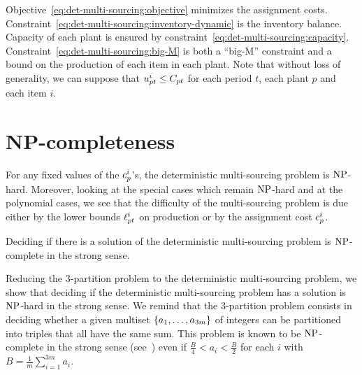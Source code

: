 Objective~\eqref{eq:det-multi-sourcing:objective} minimizes the assignment costs.
Constraint~\eqref{eq:det-multi-sourcing:inventory-dynamic} is the inventory balance.
Capacity of each plant is ensured by constraint~\eqref{eq:det-multi-sourcing:capacity}.
Constraint~\eqref{eq:det-multi-sourcing:big-M} is both a ``big-M'' constraint and a bound on the production of each item in each plant.
Note that without loss of generality, we can suppose that $u_{pt}^i \le C_{pt}$ for each period $t$, each plant $p$ and each item $i$.


\section{NP-completeness}
\label{sec:multi-sourcing:deterministic:NP-completeness}


For any fixed values of the $c_p^i$'s, the deterministic multi-sourcing problem is $\operatorname{NP}$-hard.
Moreover, looking at the special cases which remain $\operatorname{NP}$-hard and at the polynomial cases, we see that the difficulty of the multi-sourcing problem is due either by the lower bounds $\ell_{pt}^i$ on production or by the assignment cost $c_p^i$.


\begin{thm}\label{thm:deterministic-multi-sourcing:strong-NP-hard}
  Deciding if there is a solution of the deterministic multi-sourcing problem is $\operatorname{NP}$-complete in the strong sense.
\end{thm}


Reducing the 3-partition problem to the deterministic multi-sourcing problem, we show that deciding if the deterministic multi-sourcing problem has a solution is $\operatorname{NP}$-hard in the strong sense.
We remind that the 3-partition problem consists in deciding whether a given multiset $\crbracket{a_1,\ldots,a_{3m}}$ of integers can be partitioned into triples that all have the same sum.
This problem is known to be $\operatorname{NP}$-complete in the strong sense (see~\citet{Garey1979}) even if $\frac{B}{4} < a_i < \frac{B}{2}$ for each $i$ with $B=\frac{1}{m}\sum_{i=1}^{3m}a_i$.


